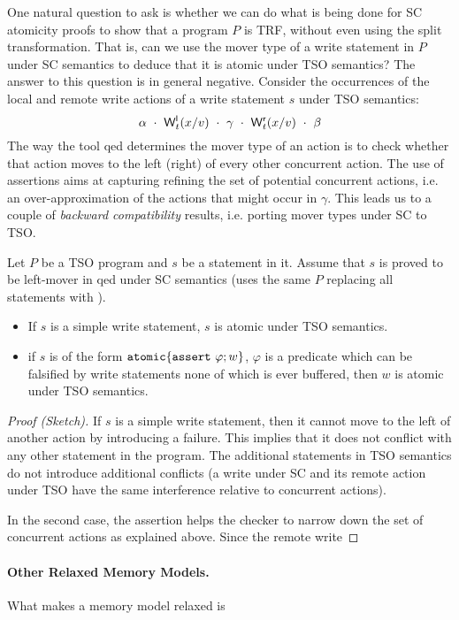 \documentclass[preprint,9pt]{sigplanconf}
\begin{document}
One natural question to ask is whether we can do what is being done for SC atomicity proofs to show that a program $P$ is TRF, without even using the split transformation.
That is, can we use the mover type of a write statement in $P$ under SC semantics to deduce that it is atomic under TSO semantics?
The answer to this question is in general negative.
Consider the occurrences of the local and remote write actions of a write statement $s$ under TSO semantics:
\[
\alpha\ \cdot\ \locwritex t x v\ \cdot\ \gamma\ \cdot\ \remwritex t x v\ \cdot\ \beta
\]
The way the tool {\sc qed} determines the mover type of an action is to check whether that action moves to the left (right) of every other concurrent action.
The use of assertions aims at capturing refining the set of potential concurrent actions, i.e. an over-approximation of the actions that might occur in $\gamma$.
This leads us to a couple of {\em backward compatibility} results, i.e. porting mover types under SC to TSO.
\begin{lemma}
Let $P$ be a TSO program and $s$ be a statement in it.
Assume that $s$ is proved to be left-mover in {\sc qed} under SC semantics (uses the same $P$ replacing all {\alifence} statements with {\aliskip}). 
\begin{itemize}
\item If $s$ is a simple write statement, $s$ is atomic under TSO semantics.
\item if $s$ is of the form $\mathtt{atomic}\{\mathtt{assert}\ \varphi; w\}$, $\varphi$ is a predicate which can be falsified by write statements none of which is ever buffered, then $w$ is atomic under TSO semantics.
\end{itemize}
\end{lemma}
\begin{proof}[Proof (Sketch)]
If $s$ is a simple write statement, then it cannot move to the left of another action by introducing a failure.
This implies that it does not conflict with any other statement in the program.
The additional statements in TSO semantics do not introduce additional conflicts (a write under SC and its remote action under TSO have the same interference relative to concurrent actions).

In the second case, the assertion helps the checker to narrow down the set of concurrent actions as explained above.
Since the remote write 
\end{proof}

\paragraph{Other Relaxed Memory Models.}
What makes a memory model relaxed is
\end{document}
